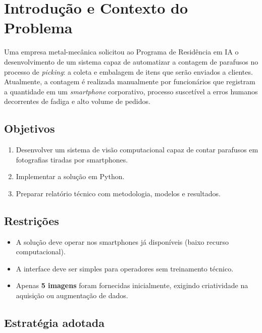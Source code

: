 \documentclass[12pt,a4paper]{article}
\begin{document}
\section{Introdu\c{c}\~ao e Contexto do Problema}

Uma empresa metal-mec\^anica solicitou ao Programa de Resid\^encia em IA o desenvolvimento de
um sistema capaz de automatizar a contagem de parafusos no processo de \emph{picking}: a
coleta e embalagem de itens que ser\~ao enviados a clientes. Atualmente, a contagem \'e
realizada manualmente por funcion\'arios que registram a quantidade em um \emph{smartphone}
corporativo, processo suscet\'ivel a erros humanos decorrentes de fadiga e alto volume de
pedidos.

\subsection{Objetivos}

\begin{enumerate}[leftmargin=*, label=\arabic*.]
  \item Desenvolver um sistema de vis\~ao computacional capaz de contar parafusos em
        fotografias tiradas por smartphones.
  \item Implementar a solu\c{c}\~ao em Python.
  \item Preparar relat\'orio t\'ecnico com metodologia, modelos e resultados.
\end{enumerate}

\subsection{Restri\c{c}\~oes}

\begin{itemize}[leftmargin=*]
  \item A solu\c{c}\~ao deve operar nos smartphones j\'a dispon\'iveis (baixo recurso
        computacional).
  \item A interface deve ser simples para operadores sem treinamento t\'ecnico.
  \item Apenas \textbf{5 imagens} foram fornecidas inicialmente, exigindo criatividade
        na aquisi\c{c}\~ao ou augmenta\c{c}\~ao de dados.
\end{itemize}

\subsection{Estrat\'egia adotada}
\end{document}
